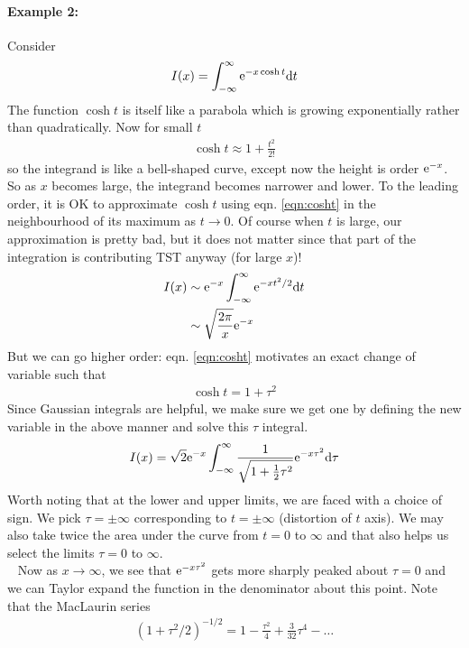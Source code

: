\paragraph{Example 2:} Consider
\begin{align*}
	I(x) = \int_{-\infty}^{\infty} \mathrm{e}^{-x \cosh t} \mathrm{d} t
\end{align*}
The function $\cosh t$ is itself like a parabola which is growing exponentially rather than quadratically. Now for small $t$
\begin{gather}
	\cosh t \approx 1 + \frac{t^2}{2!} \label{eqn:cosht}
\end{gather}
so the integrand is like a bell-shaped curve, except now the height is order $\mathrm{e}^{-x}$. So as $x$ becomes large, the integrand becomes narrower and lower. To the leading order, it is OK to approximate $\cosh t$ using eqn. \ref{eqn:cosht} in the neighbourhood of its maximum as $t \rightarrow 0$. Of course when $t$ is large, our approximation is pretty bad, but it does not matter since that part of the integration is contributing TST anyway (for large $x$)! 
\begin{align*}
	I(x) &\sim \mathrm{e}^{-x}\int_{-\infty}^{\infty} \mathrm{e}^{-xt^2/2} \mathrm{d} t \\
	& \sim \sqrt{\frac{2\pi}{x}} \mathrm{e}^{-x}
\end{align*}
But we can go higher order: eqn. \ref{eqn:cosht} motivates an exact change of variable such that
\begin{gather*}
	\cosh t = 1 + \tau^2
\end{gather*}
Since Gaussian integrals are helpful, we make sure we get one by defining the new variable in the above manner and solve this $\tau$ integral.
\begin{align*}
	I(x) = \sqrt{2}\mathrm{e}^{-x} \int_{-\infty}^{\infty} \frac{1}{\sqrt{1+\frac{1}{2}\tau^2}}\mathrm{e}^{-x \tau^2} \mathrm{d} \tau
\end{align*} 
Worth noting that at the lower and upper limits, we are faced with a choice of sign. We pick $\tau = \pm \infty$ corresponding to $t = \pm \infty$ (distortion of $t$ axis). We may also take twice the area under the curve from $t=0$ to $\infty$ and that also helps us select the limits $\tau=0$ to $\infty$.\\
\ \newline 
Now as $x \rightarrow \infty$, we see that $\mathrm{e}^{-x \tau^2}$ gets more sharply peaked about $\tau=0$ and we can Taylor expand the function in the denominator about this point. Note that the MacLaurin series
\begin{gather*}
	(1+\tau^2/2)^{-1/2} = 1 - \frac{\tau^2}{4} + \frac{3}{32} \tau^4 - \dots 
\end{gather*}
